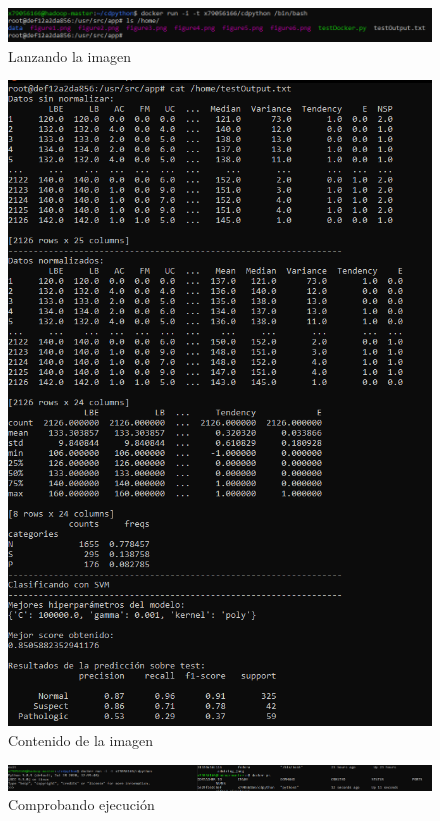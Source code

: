 \begin{figure}[H]\center\includegraphics[width=.95\linewidth]{img/python/p2.png}\caption{Lanzando la imagen}\end{figure}

\begin{figure}[H]\center\includegraphics[width=.95\linewidth]{img/python/p3.png}\caption{Contenido de la imagen}\end{figure}

\begin{figure}[H]\center\includegraphics[width=.95\linewidth]{img/python/p5.png}\caption{Comprobando ejecución}\end{figure}

